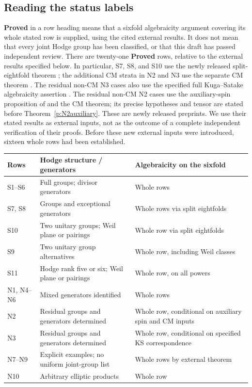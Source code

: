 \documentclass[10pt,reqno]{article}
\theoremstyle{emphasizedplain}
\DeclareRobustCommand{\provedstatus}{%
  \texorpdfstring{\textcolor{ProvedGreen}{\textbf{Proved}}}{Proved}}
\theoremstyle{emphasizeddefinition}
\theoremstyle{emphasizeddefinition}
\begin{document}
\subsection*{Reading the status labels}
\provedstatus{} in a row heading means that a sixfold algebraicity argument
covering its whole stated row is supplied, using the cited external
results. It does not mean that every joint Hodge group has been
classified, or that this draft has passed independent review.
There are twenty-one \provedstatus{} rows,
relative to the external results specified below. In particular,
S7, S8, and S10 use the newly released split-eightfold theorem
\cite[Theorem 1.1]{OpenAIEightfold}; the additional CM strata in N2 and
N3 use the separate CM theorem \cite[Theorem 1.1]{OpenAICM}.
The residual non-CM N3 cases also use the specified full
Kuga--Satake algebraicity assertion \cite[Theorem 1.1]{OpenAIKS}.
The residual non-CM N2 cases use the auxiliary-spin proposition
of \cite{OpenAIK3Products} and the CM theorem; its precise hypotheses
and tensor are stated before Theorem~\ref{p:N2auxiliary}.
These are newly released preprints. We use their
stated results as external inputs, not as the outcome of a complete
independent verification of their proofs. Before these new external
inputs were introduced, sixteen whole rows had been established.
\begin{center}
\begin{tabular}{>{\raggedright\arraybackslash}p{}>{\raggedright\arraybackslash}p{}>{\raggedright\arraybackslash}p{}}
\toprule
Rows & Hodge structure / generators & Algebraicity on the sixfold\\
\midrule
S1--S6 & Full groups; divisor generators & Whole rows\\
S7, S8 & Groups and exceptional generators & Whole rows via split eightfolds\\
S10 & Two unitary groups; Weil plane or pairings & Whole row via split eightfolds\\
S9 & Two unitary group alternatives & Whole row, including Weil classes\\
S11 & Hodge rank five or six; Weil plane or pairings & Whole row, on all powers\\
N1, N4--N6 & Mixed generators identified & Whole rows\\
N2 & Residual groups and generators determined & Whole row, conditional on auxiliary spin and CM inputs\\
N3 & Residual groups and generators determined & Whole row, conditional on specified KS correspondence\\
N7--N9 & Explicit examples; no uniform joint-group list & Whole rows by external theorem\\
N10 & Arbitrary elliptic products & Whole row\\
\bottomrule
\end{tabular}
\end{center}
\end{document}
